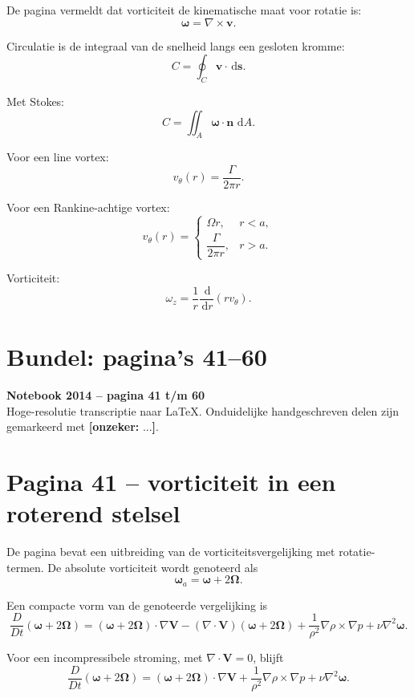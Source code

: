 \documentclass[11pt,a4paper]{article}
\newcommand{\onzeker}[1]{\ifmmode\text{\color{red!70!black}\bfseries[onzeker]}\else\textcolor{red!70!black}{\textbf{[onzeker:} #1\textbf{]}}\fi}
\newcommand{\dd}{\,\mathrm{d}}
\newcommand{\Dt}{\frac{D}{Dt}}
\newcommand{\divergence}{\nabla\cdot}
\newcommand{\grad}{\nabla}
\newcommand{\curl}{\nabla\times}
\newcommand{\V}{\mathbf{V}}
\newcommand{\omegav}{\bm{\omega}}
\newcommand{\Omegav}{\bm{\Omega}}
\begin{document}
De pagina vermeldt dat vorticiteit de kinematische maat voor rotatie is:
\[
    \bm{\omega}
    =
    \curl\mathbf{v}.
\]

Circulatie is de integraal van de snelheid langs een gesloten kromme:
\[
    C
    =
    \oint_C \mathbf{v}\cdot\dd\mathbf{s}.
\]

Met Stokes:
\[
    C
    =
    \iint_A \bm{\omega}\cdot\mathbf{n}\,\dd A .
\]

Voor een line vortex:
\[
    v_\theta(r)
    =
    \frac{\Gamma}{2\pi r}.
\]

Voor een Rankine-achtige vortex:
\[
    v_\theta(r)
    =
    \begin{cases}
    \Omega r, & r<a,\\
    \dfrac{\Gamma}{2\pi r}, & r>a.
    \end{cases}
\]

Vorticiteit:
\[
    \omega_z
    =
    \frac{1}{r}\frac{\dd}{\dd r}\left(r v_\theta\right).
\]

\clearpage
\section*{Bundel: pagina's 41--60}
\begin{center}
{\Large \textbf{Notebook 2014 -- pagina 41 t/m 60}}\\
\vspace{0.3em}
{\small Hoge-resolutie transcriptie naar \LaTeX. Onduidelijke handgeschreven delen zijn gemarkeerd met \onzeker{...}.}
\end{center}

\section*{Pagina 41 -- vorticiteit in een roterend stelsel}

De pagina bevat een uitbreiding van de vorticiteitsvergelijking met rotatie-termen. De absolute vorticiteit wordt genoteerd als
$$
\omegav_a = \omegav + 2\Omegav .
$$

Een compacte vorm van de genoteerde vergelijking is
$$
\Dt\left(\omegav + 2\Omegav\right)
=
\left(\omegav + 2\Omegav\right)\cdot\grad \V
-
\left(\divergence \V\right)\left(\omegav + 2\Omegav\right)
+
\frac{1}{\rho^2}\grad \rho \times \grad p
+
\nu \grad^2 \omegav .
$$

Voor een incompressibele stroming, met $\divergence\V=0$, blijft
$$
\Dt\left(\omegav + 2\Omegav\right)
=
\left(\omegav + 2\Omegav\right)\cdot\grad \V
+
\frac{1}{\rho^2}\grad \rho \times \grad p
+
\nu \grad^2 \omegav .
$$
\end{document}
